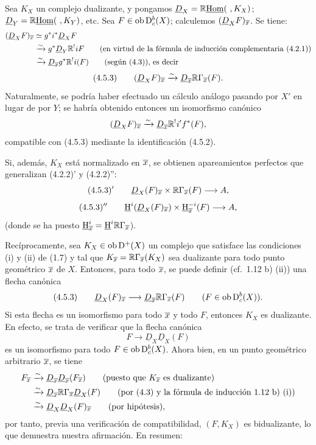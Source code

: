 Sea $K_X$ un complejo dualizante, y pongamos $\underline{D}_X=\mathbb{R}\underline{\operatorname{Hom}}(\ ,K_X)$; $\underline{D}_Y=\R\underline{\Hom}(\ ,K_Y)$, etc. Sea $F\in\operatorname{ob}\mathrm{D}_c^b(X)$; calculemos $(\underline{D}_XF)_{\overline{x}}$. Se tiene:
\[
\begin{aligned}
(\underline{D}_XF)_{\overline{x}}&\simeq g^*i^*\underline{D}_X F\\
&\xrightarrow{\sim}g^*\underline{D}_Y\mathbb{R}^{!}iF\qquad\text{(en virtud de la fórmula de inducción complementaria (4.2.1))}\\
&\xrightarrow{\sim}\underline{D}_{\overline{x}}g^*\mathbb{R}^{!}i(F)\qquad\text{(según (4.3)), es decir}
\end{aligned}
\]
\[
(4.5.3)\qquad (\underline{D}_X F)_{\overline{x}}\xrightarrow{\sim}\underline{D}_{\overline{x}}\mathbb{R}\Gamma_{\overline{x}}(F).
\]
Naturalmente, se podría haber efectuado un cálculo análogo pasando por $X'$ en lugar de por $Y$; se habría obtenido entonces un isomorfismo canónico
\[
(\underline{D}_XF)_{\overline{x}}\xrightarrow{\sim}\underline{D}_{\overline{x}}\mathbb{R}^{!}i'f^*(F),
\]
compatible con (4.5.3) mediante la identificación (4.5.2).

Si, además, $K_X$ está normalizado en $\overline{x}$, se obtienen apareamientos perfectos que generalizan (4.2.2)' y (4.2.2)'':
\[
(4.5.3)'\qquad \underline{D}_X(F)_{\overline{x}}\times \mathbb{R}\Gamma_{\overline{x}}(F)\longrightarrow A,
\]
\[
(4.5.3)''\qquad \underline{\mathrm H}^i(\underline{D}_X(F)_{\overline{x}})\times \underline{\mathrm H}_{\overline{x}}^{-i}(F)\longrightarrow A,
\]
(donde se ha puesto $\underline{\mathrm H}_{\overline{x}}^i=\underline{\mathrm H}^i\mathbb{R}\Gamma_{\overline{x}}$).

Recíprocamente, sea $K_X\in\operatorname{ob}\mathrm{D}^+(X)$ un complejo que satisface las condiciones (i) y (ii) de (1.7) y tal que $K_{\overline{x}}=\mathbb{R}\Gamma_{\overline{x}}(K_X)$ sea dualizante para todo punto geométrico $\overline{x}$ de $X$. Entonces, para todo $\overline{x}$, se puede definir (cf.~1.12 b) (ii)) una flecha canónica
\[
(4.5.3)\qquad \underline{D}_X(F)_{\overline{x}}\longrightarrow \underline{D}_{\overline{x}}\mathbb{R}\Gamma_{\overline{x}}(F)\qquad (F\in\operatorname{ob}\mathrm{D}_c^b(X)).
\]
Si esta flecha es un isomorfismo para todo $\overline{x}$ y todo $F$, entonces $K_X$ es dualizante. En efecto, se trata de verificar que la flecha canónica
\[
F\longrightarrow \underline{D}_X\underline{D}_X(F)
\]
es un isomorfismo para todo $F\in\operatorname{ob}\mathrm{D}_c^b(X)$. Ahora bien, en un punto geométrico arbitrario $\overline{x}$, se tiene
\[
\begin{aligned}
F_{\overline{x}}&\xrightarrow{\sim}\underline{D}_{\overline{x}}\underline{D}_{\overline{x}}(F_{\overline{x}})\qquad\text{(puesto que $K_{\overline{x}}$ es dualizante)}\\
&\xrightarrow{\sim}\underline{D}_{\overline{x}}\mathbb{R}\Gamma_{\overline{x}}\underline{D}_X(F)\qquad\text{(por (4.3) y la fórmula de inducción 1.12 b) (i))}\\
&\xrightarrow{\sim}\underline{D}_X\underline{D}_X(F)_{\overline{x}}\qquad\text{(por hipótesis)},
\end{aligned}
\]
por tanto, previa una verificación de compatibilidad, $(F,K_X)$ es bidualizante, lo que demuestra nuestra afirmación. En resumen:

